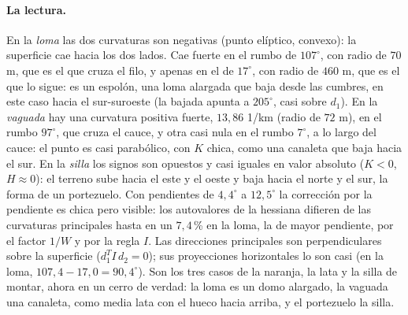\paragraph{La lectura.} En la \emph{loma} las dos curvaturas son negativas (punto elíptico,
convexo): la superficie cae hacia los dos lados. Cae fuerte en el rumbo de
\(107^\circ\), con radio de \(70\) m, que es el que cruza el filo, y apenas en el de
\(17^\circ\), con radio de \(460\) m, que es el que lo sigue: es un espolón, una loma alargada
que baja desde las cumbres, en este caso hacia el
sur-suroeste (la bajada apunta a \(205^\circ\), casi sobre \(d_1\)). En la
\emph{vaguada} hay una curvatura positiva fuerte, \(13{,}86\) 1/km (radio de \(72\) m), en el
rumbo \(97^\circ\), que cruza el cauce, y otra casi nula en el rumbo \(7^\circ\), a lo largo
del cauce: el punto es casi parabólico, con \(K\) chica, como una canaleta que baja hacia el
sur. En la \emph{silla} los signos son opuestos y casi iguales en valor absoluto
(\(K<0\), \(H\approx0\)): el terreno sube hacia el este y el oeste y baja hacia el norte y el
sur, la forma de un portezuelo. Con pendientes de \(4{,}4^\circ\) a \(12{,}5^\circ\) la corrección por
la pendiente es chica pero visible: los autovalores de la hessiana difieren de las curvaturas
principales hasta en un \(7{,}4\)\,\% en la loma, la de mayor pendiente, por el factor \(1/W\) y por la
regla \(I\). Las direcciones principales son perpendiculares sobre la superficie
(\(d_1^TI\,d_2=0\)); sus proyecciones horizontales lo son casi (en la loma, \(107{,}4-17{,}0=90{,}4^\circ\)).
Son los tres casos de la naranja, la lata y la silla de montar, ahora en un cerro de verdad: la
loma es un domo alargado, la vaguada una canaleta, como media lata con el hueco hacia arriba, y el portezuelo la
silla.

